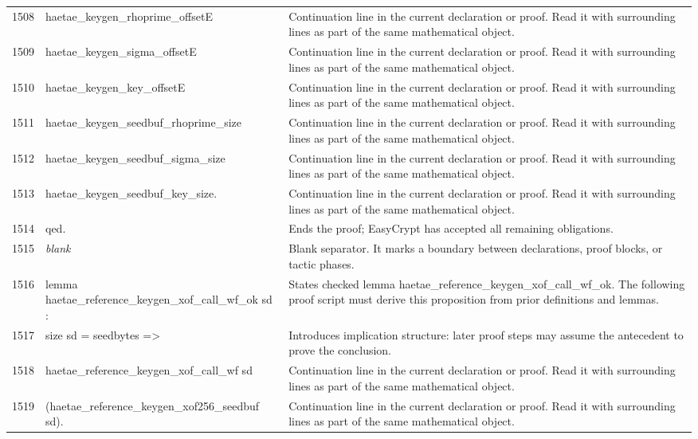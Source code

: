 \documentclass[10pt]{article}
\begin{document}
\begin{longtable}{r L{0.53\textwidth} L{0.37\textwidth}}
1508 & {\ttfamily\scriptsize            haetae\_keygen\_rhoprime\_offsetE} & Continuation line in the current declaration or proof.  Read it with surrounding lines as part of the same mathematical object. \\
1509 & {\ttfamily\scriptsize            haetae\_keygen\_sigma\_offsetE} & Continuation line in the current declaration or proof.  Read it with surrounding lines as part of the same mathematical object. \\
1510 & {\ttfamily\scriptsize            haetae\_keygen\_key\_offsetE} & Continuation line in the current declaration or proof.  Read it with surrounding lines as part of the same mathematical object. \\
1511 & {\ttfamily\scriptsize            haetae\_keygen\_seedbuf\_rhoprime\_size} & Continuation line in the current declaration or proof.  Read it with surrounding lines as part of the same mathematical object. \\
1512 & {\ttfamily\scriptsize            haetae\_keygen\_seedbuf\_sigma\_size} & Continuation line in the current declaration or proof.  Read it with surrounding lines as part of the same mathematical object. \\
1513 & {\ttfamily\scriptsize            haetae\_keygen\_seedbuf\_key\_size.} & Continuation line in the current declaration or proof.  Read it with surrounding lines as part of the same mathematical object. \\
1514 & {\ttfamily\scriptsize qed.} & Ends the proof; EasyCrypt has accepted all remaining obligations. \\
1515 & {\ttfamily\scriptsize \emph{blank}} & Blank separator.  It marks a boundary between declarations, proof blocks, or tactic phases. \\
1516 & {\ttfamily\scriptsize lemma haetae\_reference\_keygen\_xof\_call\_wf\_ok sd :} & States checked lemma haetae\_reference\_keygen\_xof\_call\_wf\_ok.  The following proof script must derive this proposition from prior definitions and lemmas. \\
1517 & {\ttfamily\scriptsize   size sd = seedbytes =>} & Introduces implication structure: later proof steps may assume the antecedent to prove the conclusion. \\
1518 & {\ttfamily\scriptsize   haetae\_reference\_keygen\_xof\_call\_wf sd} & Continuation line in the current declaration or proof.  Read it with surrounding lines as part of the same mathematical object. \\
1519 & {\ttfamily\scriptsize     (haetae\_reference\_keygen\_xof256\_seedbuf sd).} & Continuation line in the current declaration or proof.  Read it with surrounding lines as part of the same mathematical object. \\

\end{longtable}
\end{document}
